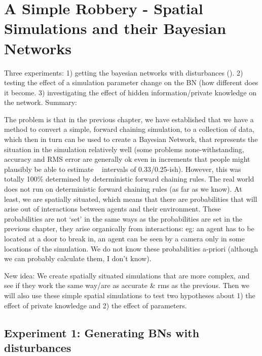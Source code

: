  

\chapter[Simple Spatial Simulations]{A Simple Robbery - Spatial Simulations and their Bayesian Networks}

Three experiments: 1) getting the bayesian networks with disturbances (). 2) testing the effect of a simulation parameter change on the BN (how different does it become. 3) investigating the effect of hidden information/private knowledge on the network.
Summary:

 The problem is that in the previous chapter, we have established that we have a method to convert a simple, forward chaining simulation, to a collection of data, which then in turn can be used to create a Bayesian Network, that represents the situation in the simulation relatively well (some problems none-withstanding, accuracy and RMS error are generally ok even in increments that people might plausibly be able to estimate ~ intervals of 0.33/0.25-ish). However, this was totally 100\% determined by deterministic forward chaining rules. The real world does not run on deterministic forward chaining rules (as far as we know). At least, we are spatially situated, which means that there are probabilities that will arise out of interactions between agents and their environment. These probabilities are not `set' in the same ways as the probabilities are set in the previous chapter, they arise organically from interactions: eg: an agent has to be located at a door to break in, an agent can be seen by a camera only in some locations of the simulation. We do not know these probabilities a-priori (although we can probably calculate them, I don't know).
 
New idea: We create spatially situated simulations that are more complex, and see if they work the same way/are as accurate \& rms as the previous. Then we will also use these simple spatial simulations to test two hypotheses about 1) the effect of private knowledge and 2) the effect of parameters.


\section{Experiment 1: Generating BNs with disturbances}
